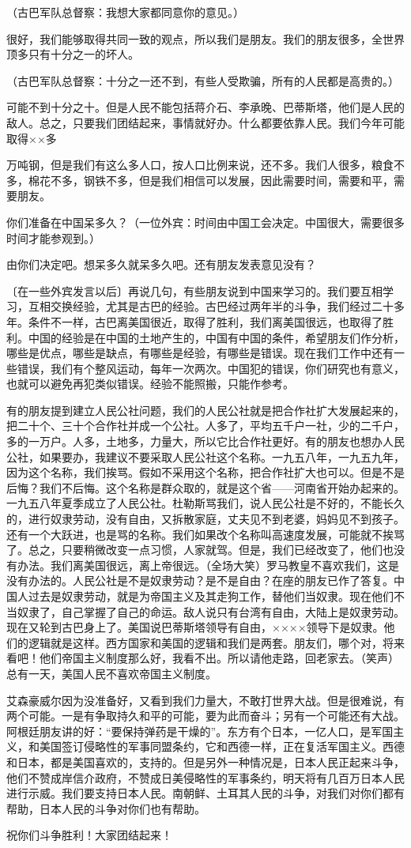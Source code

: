 （古巴军队总督察：我想大家都同意你的意见。）

很好，我们能够取得共同一致的观点，所以我们是朋友。我们的朋友很多，全世界顶多只有十分之一的坏人。

（古巴军队总督察：十分之一还不到，有些人受欺骗，所有的人民都是高贵的。）

可能不到十分之十。但是人民不能包括蒋介石、李承晚、巴蒂斯塔，他们是人民的敌人。总之，只要我们团结起来，事情就好办。什么都要依靠人民。我们今年可能取得××多

万吨钢，但是我们有这么多人口，按人口比例来说，还不多。我们人很多，粮食不多，棉花不多，钢铁不多，但是我们相信可以发展，因此需要时间，需要和平，需要朋友。

你们准备在中国呆多久？（一位外宾：时间由中国工会决定。中国很大，需要很多时间才能参观到。）

由你们决定吧。想呆多久就呆多久吧。还有朋友发表意见没有？

〔在一些外宾发言以后〕再说几句，有些朋友说到中国来学习的。我们要互相学习，互相交换经验，尤其是古巴的经验。古巴经过两年半的斗争，我们经过二十多年。条件不一样，古巴离美国很近，取得了胜利，我们离美国很远，也取得了胜利。中国的经验是在中国的土地产生的，中国有中国的条件，希望朋友们作分析，哪些是优点，哪些是缺点，有哪些是经验，有哪些是错误。现在我们工作中还有一些错误，我们有个整风运动，每年一次两次。中国犯的错误，你们研究也有意义，也就可以避免再犯类似错误。经验不能照搬，只能作参考。

有的朋友提到建立人民公社问题，我们的人民公社就是把合作社扩大发展起来的，把二十个、三十个合作社并成一个公社。人多了，平均五千户一社，少的二千户，多的一万户。人多，土地多，力量大，所以它比合作社更好。有的朋友也想办人民公社，如果要办，我建议不要采取人民公社这个名称。一九五八年，一九五九年，因为这个名称，我们挨骂。假如不采用这个名称，把合作社扩大也可以。但是不是后悔？我们不后悔。这个名称是群众取的，就是这个省——河南省开始办起来的。一九五八年夏季成立了人民公社。杜勒斯骂我们，说人民公社是不好的，不能长久的，进行奴隶劳动，没有自由，又拆散家庭，丈夫见不到老婆，妈妈见不到孩子。还有一个大跃进，也是骂的名称。我们如果改个名称叫高速度发展，可能就不挨骂了。总之，只要稍微改变一点习惯，人家就驾。但是，我们已经改变了，他们也没有办法。我们离美国很远，离上帝很远。（全场大笑）罗马教皇不喜欢我们，这是没有办法的。人民公社是不是奴隶劳动？是不是自由？在座的朋友已作了答复。中国人过去是奴隶劳动，就是为帝国主义及其走狗工作，替他们当奴隶。现在他们不当奴隶了，自己掌握了自己的命运。敌人说只有台湾有自由，大陆上是奴隶劳动。现在又轮到古巴身上了。美国说巴蒂斯塔领导有自由，××××领导下是奴隶。他们的逻辑就是这样。西方国家和美国的逻辑和我们是两套。朋友们，哪个对，将来看吧！他们帝国主义制度那么好，我看不出。所以请他走路，回老家去。（笑声）总有一天，美国人民不喜欢帝国主义制度。

艾森豪威尔因为没准备好，又看到我们力量大，不敢打世界大战。但是很难说，有两个可能。一是有争取持久和平的可能，要为此而奋斗；另有一个可能还有大战。阿根廷朋友讲的好：“要保持弹药是干燥的”。东方有个日本，一亿人口，是军国主义，和美国签订侵略性的军事同盟条约，它和西德一样，正在复活军国主义。西德和日本，都是美国喜欢的，支持的。但是另外一种情况是，日本人民正起来斗争，他们不赞成岸信介政府，不赞成日美侵略性的军事条约，明天将有几百万日本人民进行示威。我们要支持日本人民。南朝鲜、土耳其人民的斗争，对我们对你们都有帮助，日本人民的斗争对你们也有帮助。

祝你们斗争胜利！大家团结起来！


